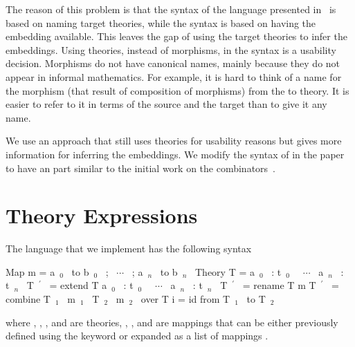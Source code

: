 The reason of this problem is that the syntax of the language presented in~\cite{carette2018building} is based on naming target theories, while the syntax is based on having the embedding available. This leaves the gap of using the target theories to infer the embeddings. Using theories, instead of morphisms, in the syntax is a usability decision. Morphisms do not have canonical names, mainly because they do not appear in informal mathematics. For example, it is hard to think of a name for the morphism (that result of composition of morphisms) from the  to  theory. It is easier to refer to it in terms of the source and the target than to give it any name. 

We use an approach that still uses theories for usability reasons but gives more information for inferring the embeddings. We modify the syntax of  in the paper to have an  part similar to the initial work on the combinators~\cite{CaretteOConnorTPC}. 

\begin{comment}
\subsection{All Paths Commute Approach} 
\ednote{@JC: Do we need to remove mixin, so all paths commute?} 
When referring to a morphism using its source and target, we implicitly assume that all paths commute, i.e.: Given the source and target, they either is no path, one path, or multiple paths that commute between them. 

In Section~\ref{sec:background:morphisms}, we discussed the three types of morphisms, identity, embeddings and general morphisms. We also noted in Section~\ref{subsec:mixin} that the only combinator that accepts and generates a general morphism is \lstmath{mixin}. If we restrict our language to \lstmath{extension}, \lstmath{rename}, and \lstmath{combine}, we end up with an all-embeddings graph, in which all paths commute. 
\end{comment}

\section{Theory Expressions}
\label{sec:impl:expressions}
The language that we implement has the following syntax
\begin{togcode}
 Map m = {a~$_0$~ to b~$_0$~ ; ~$\cdots$~ ; a~$_n$~ to b~$_n$~}
 Theory T = {a~$_0$~ : t~$_0$~ ~$\cdots$~ a~$_n$~ : t~$_n$~}
 T~$^\prime$~ = extend T {a~$_0$~ : t~$_0$~ ~$\cdots$~ a~$_n$~ : t~$_n$~}
 T~$^\prime$~ = rename T m 
 T~$^\prime$~ = combine T~$_1$~ m~$_1$~ T~$_2$~ m~$_2$~ over T
 i = id from T~$_1$~ to T~$_2$~
\end{togcode} 
\noindent where , , , and  are theories, , , and  are mappings that can be  either previously defined using the  keyword or expanded as a list of mappings 
. 

